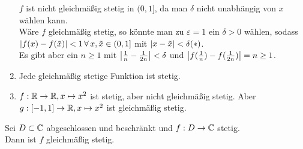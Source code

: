 \documentclass[../ana1.tex]{subfiles}
\begin{document}
\begin{bspe}
\begin{enumerate}
\begin{center}
\begin{tikzpicture}[scale = 3]
            \end{tikzpicture}
        \end{center}
        \( f \) ist nicht gleichmäßig stetig in \( (0,1] \),
        da man \( \delta \) nicht unabhängig von \(x\) wählen
        kann.\\
        Wäre \( f \) gleichmäßig stetig, so könnte man zu 
        \( \varepsilon = 1 \) ein \( \delta > 0 \) wählen,
        sodass \( \abs{ f(x) - f(\tilde{x}) } < 1 
        \,\forall \, x, \tilde{x} \in (0,1] \) mit 
        \( \abs{ x - \tilde{x} } < \delta (*) \).\\
        Es gibt aber ein \( n \geq 1 \) mit 
        \( \abs{ \frac{1}{n} - \frac{1}{2n} } < \delta \)
        und \( \abs{ f(\frac{1}{n}) - f(\frac{1}{2n}) } 
        = n \geq 1 \).
        \item Jede gleichmäßig stetige Funktion ist stetig.
        \item \( f: \R \rightarrow \R, x\mapsto x^2 \) ist stetig,
        aber nicht gleichmäßig stetig. 
        Aber \( g: [-1, 1] \rightarrow \R, x \mapsto x^2 \)
        ist gleichmäßig stetig.
    \end{enumerate}
\end{bspe}
\begin{satz}
    Sei \( D \subset \C \) abgeschlossen und beschränkt
    und \( f: D \rightarrow \C \) stetig.\\
    Dann ist \(f\) gleichmäßig stetig.
\end{satz}
\end{document}
